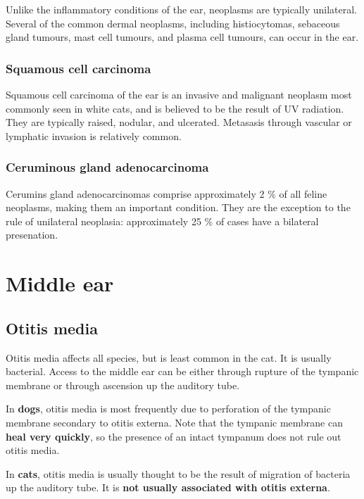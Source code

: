 \documentclass[openany]{book}
\begin{document}
Unlike the inflammatory conditions of the ear, neoplasms are typically
unilateral. Several of the common dermal neoplasms, including
histiocytomas, sebaceous gland tumours, mast cell tumours, and plasma
cell tumours, can occur in the ear.

\subsubsection{Squamous cell carcinoma}\label{squamous-cell-carcinoma}

Squamous cell carcinoma of the ear is an invasive and malignant neoplasm
most commonly seen in white cats, and is believed to be the result of UV
radiation. They are typically raised, nodular, and ulcerated. Metasasis
through vascular or lymphatic invasion is relatively common.

\subsubsection{Ceruminous gland
adenocarcinoma}\label{ceruminous-gland-adenocarcinoma}

Cerumins gland adenocarcinomas comprise approximately 2 \% of all feline
neoplasms, making them an important condition. They are the exception to
the rule of unilateral neoplasia: approximately 25 \% of cases have a
bilateral presenation.

\section{Middle ear}\label{middle-ear}

\hypertarget{otitis-media}{\subsection{Otitis
media}\label{otitis-media}}

Otitis media affects all species, but is least common in the cat. It is
usually bacterial. Access to the middle ear can be either through
rupture of the tympanic membrane or through ascension up the auditory
tube.

In \textbf{dogs}, otitis media is most frequently due to perforation of
the tympanic membrane secondary to otitis externa. Note that the
tympanic membrane can \textbf{heal very quickly}, so the presence of an
intact tympanum does not rule out otitis media.

In \textbf{cats}, otitis media is usually thought to be the result of
migration of bacteria up the auditory tube. It is \textbf{not usually
associated with otitis externa}.
\end{document}
